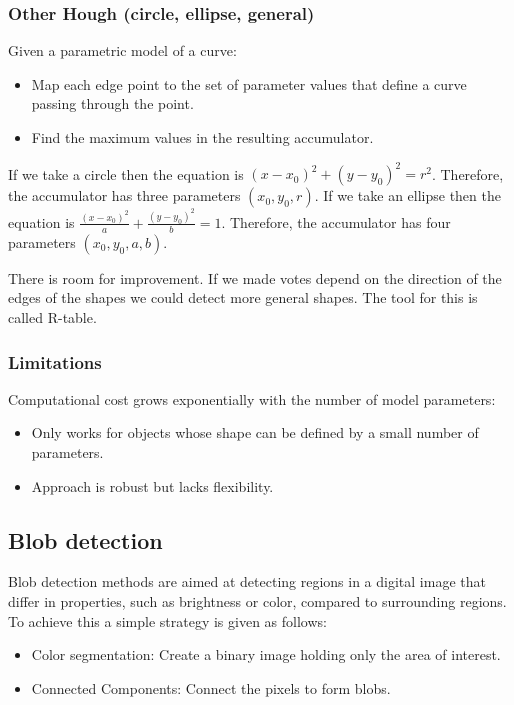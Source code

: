 \subsubsection{Other Hough (circle, ellipse, general)}

Given a parametric model of a curve:

\begin{itemize}
\item Map each edge point to the set of parameter values that define a curve passing through the point.
\item Find the maximum values in the resulting accumulator.
\end{itemize}

If we take a circle then the equation is $(x-x_0)^2 + (y-y_0)^2 = r^2$. Therefore, the accumulator has three parameters $(x_0,y_0,r)$. If we take an ellipse then the equation is $\frac{(x-x_0)^2}{a}+\frac{(y-y_0)^2}{b} = 1$. Therefore, the accumulator has four parameters $(x_0,y_0,a,b)$.

There is room for improvement. If we made votes depend on the direction of the edges of the shapes we could detect more general shapes. The tool for this is called R-table.

\subsubsection{Limitations}

Computational cost grows exponentially with the number of model parameters:

\begin{itemize}
\item Only works for objects whose shape can be defined by a small number of parameters.
\item Approach is robust but lacks flexibility.
\end{itemize}

\subsection{Blob detection}

Blob detection methods are aimed at detecting regions in a digital image that differ in properties, such as brightness or color, compared to surrounding regions. To achieve this a simple strategy is given as follows:

\begin{itemize}
\item Color segmentation: Create a binary image holding only the area of interest.
\item Connected Components: Connect the pixels to form blobs.
\end{itemize}

